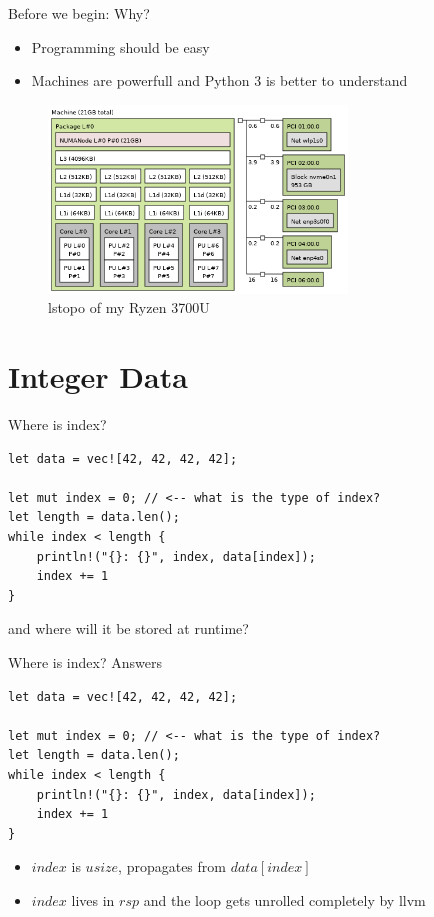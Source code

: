 \documentclass[10pt,aspectratio=169]{beamer}
\begin{document}
\begin{frame}{Before we begin: Why?}
  
\begin{itemize}
\item Programming should be easy
\item Machines are powerfull and Python 3 is better to understand 
\end{itemize}

\begin{figure}
    \includegraphics[height=5cm]{./lstopo.png}
    \caption{lstopo of my Ryzen 3700U}
\end{figure}
\end{frame}


\section{Integer Data}

\begin{frame}[fragile]{Where is index?}

\begin{verbatim}
let data = vec![42, 42, 42, 42];

let mut index = 0; // <-- what is the type of index?
let length = data.len();
while index < length {
    println!("{}: {}", index, data[index]);
    index += 1
}
\end{verbatim}
and \alert{where} will it be stored at runtime?
\end{frame}


\begin{frame}[fragile]{Where is index? Answers}

\begin{verbatim}
let data = vec![42, 42, 42, 42];

let mut index = 0; // <-- what is the type of index?
let length = data.len();
while index < length {
    println!("{}: {}", index, data[index]);
    index += 1
}
\end{verbatim}

\begin{itemize}
    \item $index$ is \alert{$usize$}, propagates from $data[index]$
    \item $index$ lives in \alert{$rsp$} and the loop gets unrolled completely by llvm
\end{itemize}
\end{frame}
\end{document}
